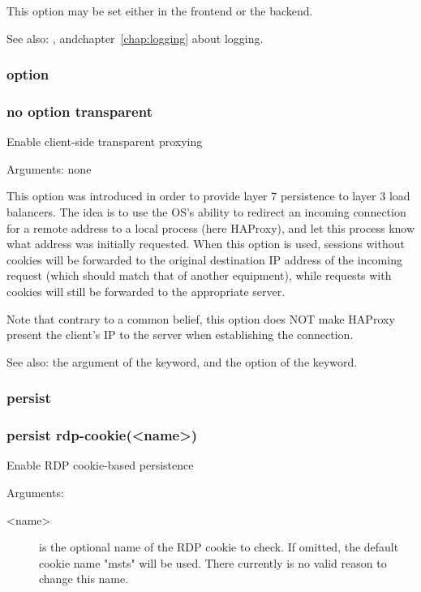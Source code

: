 {  This option may be set either in the frontend or the backend.

  See also: , andchapter~\ref{chap:logging} about logging.

\subsubsection[transparent]{option }
\subsubsection*{no option transparent}

  Enable client-side transparent proxying


  Arguments: none

  This option was introduced in order to provide layer 7 persistence to layer 3
  load balancers. The idea is to use the OS's ability to redirect an incoming
  connection for a remote address to a local process (here HAProxy), and let
  this process know what address was initially requested. When this option is
  used, sessions without cookies will be forwarded to the original destination
  IP address of the incoming request (which should match that of another
  equipment), while requests with cookies will still be forwarded to the
  appropriate server.

  Note that contrary to a common belief, this option does NOT make HAProxy
  present the client's IP to the server when establishing the connection.

  See also: the  argument of the  keyword, and the
             option of the  keyword.

\subsubsection{persist }
\subsubsection*{persist rdp-cookie(<name>)}

  Enable RDP cookie-based persistence


  Arguments:
  \begin{description}
  \item[<name>] is the optional name of the RDP cookie to check. If omitted, the
              default cookie name "msts" will be used. There currently is no
              valid reason to change this name.
  \end{description}

}
